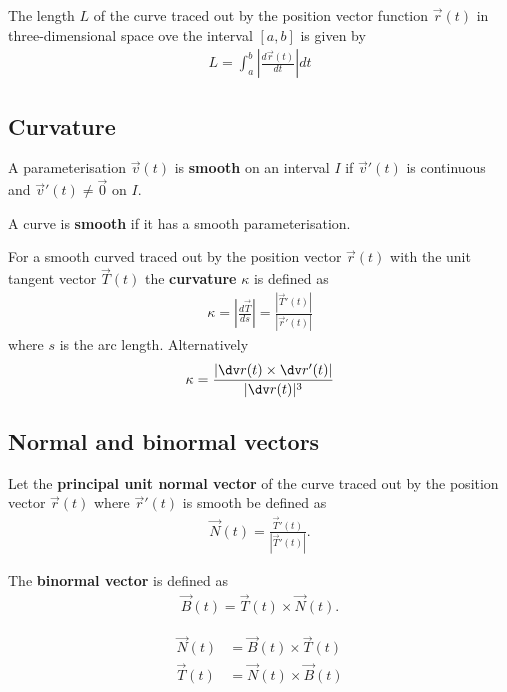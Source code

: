 \documentclass{article}
\begin{document}
\begin{theorem}
	The length $L$ of the curve traced out by the position vector function $\vec r(t)$ in three-dimensional space ove the interval
	$[a,b]$ is given by
	\begin{align*}
		L = \int_a^b \left|\frac{d\vec r(t)}{dt}\right| dt
	\end{align*}
\end{theorem}


\subsection{Curvature}


\begin{definition}
	A parameterisation $\vec v(t)$ is \textbf{smooth} on an interval $I$ if $\vec v'(t)$ is continuous and $\vec v'(t) \not = \vec 0$ on $I$.
\end{definition}
\begin{definition}
	A curve is \textbf{smooth} if it has a smooth parameterisation.
\end{definition}
\begin{definition}
	For a smooth curved traced out by the position vector $\vec r(t)$ with the unit tangent vector
	$\vec T(t)$ the \textbf{curvature} $\kappa$ is defined as
	\begin{align*}
		\kappa = \left|\frac{d\vec T}{ds}\right|=\frac{\left| \vec T'(t)\right|}{\left|\vec r'(t)\right|}
	\end{align*}
	where $s$ is the arc length.
	Alternatively
	\begin{align*}
		\kappa = \frac{\left|\dv r(t) \times \dv r'(t)\right|}{|\dv r(t)|^3}
	\end{align*}
\end{definition}


\subsection{Normal and binormal vectors}


\begin{definition}
	Let the \textbf{principal unit normal vector} of the curve traced out by the position vector $\vec r(t)$
	where $\vec r'(t)$ is smooth be defined as
	\begin{align*}
		\vec N (t) = \frac{\vec T'(t)}{\left| \vec T'(t) \right|}.
	\end{align*}
\end{definition}
\begin{definition}
	The \textbf{binormal vector} is defined as
	\begin{align*}
		\vec B(t) = \vec T(t) \times \vec N(t).
	\end{align*}
\end{definition}
\begin{theorem}
	\begin{align*}
		\vec N(t) & = \vec B(t) \times \vec T(t) \\
		\vec T(t) & = \vec N(t) \times \vec B(t)
	\end{align*}
\end{theorem}
\end{document}
